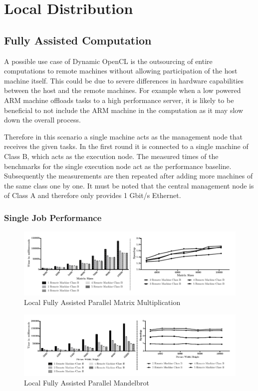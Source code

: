 \section{Local Distribution}
\label{local_distribution}

\subsection{Fully Assisted Computation}
A possible use case of Dynamic OpenCL is the outsourcing of entire computations to remote machines without allowing participation of the host machine itself. This could be due to severe differences in hardware capabilities between the host and the remote machines. For example when a low powered ARM machine offloads tasks to a high performance server, it is likely to be beneficial to not include the ARM machine in the computation as it may slow down the overall process.

Therefore in this scenario a single machine acts as the management node that receives the given tasks. In the first round it is connected to a single machine of Class B, which acts as the execution node. The measured times of the benchmarks for the single execution node act as the performance baseline. Subsequently the measurements are then repeated after adding more machines of the same class one by one. It must be noted that the central management node is of Class A and therefore only provides 1 Gbit/s Ethernet.

\subsubsection*{Single Job Performance}

\begin{figure}[H]
	
	\includegraphics[width=1.0\textwidth]{images/local_fully_assisted_matrix.pdf}
	\centering
	\caption{Local Fully Assisted Parallel Matrix Multiplication}
	\label{img:fully_assisted_parallel_matrix}
\end{figure}


\begin{figure}[H]
	
	\includegraphics[width=1.0\textwidth]{images/local_fully_assisted_mandelbrot.pdf}
	\centering
	\caption{Local Fully Assisted Parallel Mandelbrot}
	\label{img:fully_assisted_parallel_mandelbrot}
\end{figure}
